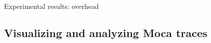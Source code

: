 \documentclass[xcolor={usenames,dvipsnames},hyperref={pdfusetitle}]{beamer}
\begin{document}
\begin{frame}{Experimental results: overhead}
    \pause
\end{frame}

\subsection{Visualizing and analyzing Moca traces}
\end{document}
